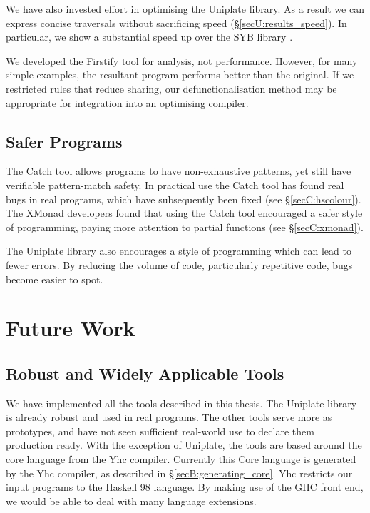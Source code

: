We have also invested effort in optimising the Uniplate library. As a result we can express concise traversals without sacrificing speed (\S\ref{secU:results_speed}). In particular, we show a substantial speed up over the SYB library \cite{lammel:syb}.

We developed the Firstify tool for analysis, not performance. However, for many simple examples, the resultant program performs better than the original. If we restricted rules that reduce sharing, our defunctionalisation method may be appropriate for integration into an optimising compiler.

\subsection{Safer Programs}

The Catch tool allows programs to have non-exhaustive patterns, yet still have verifiable pattern-match safety. In practical use the Catch tool has found real bugs in real programs, which have subsequently been fixed (see \S\ref{secC:hscolour}). The XMonad developers found that using the Catch tool encouraged a safer style of programming, paying more attention to partial functions (see \S\ref{secC:xmonad}).

The Uniplate library also encourages a style of programming which can lead to fewer errors. By reducing the volume of code, particularly repetitive code, bugs become easier to spot.

\section{Future Work}
\label{secE:future_work}

\subsection{Robust and Widely Applicable Tools}

We have implemented all the tools described in this thesis. The Uniplate library is already robust and used in real programs. The other tools serve more as prototypes, and have not seen sufficient real-world use to declare them production ready. With the exception of Uniplate, the tools are based around the core language from the Yhc compiler. Currently this Core language is generated by the Yhc compiler, as described in \S\ref{secB:generating_core}. Yhc restricts our input programs to the Haskell 98 language. By making use of the GHC front end, we would be able to deal with many language extensions.

